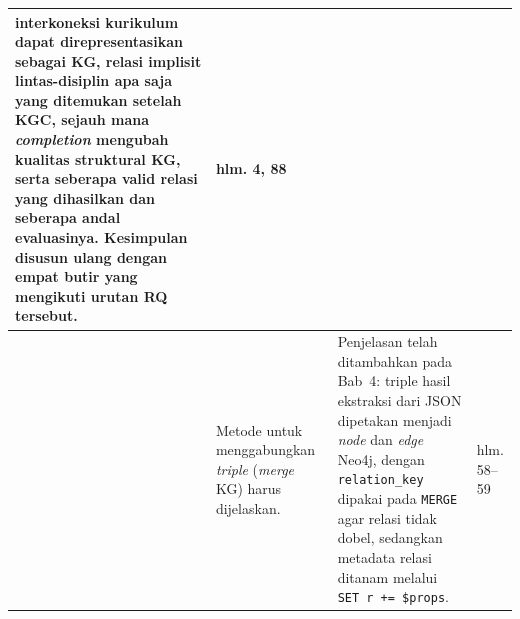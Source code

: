 \documentclass[12pt, a4paper]{article}
\begin{document}
\begin{longtable}{|
  >{\centering\arraybackslash}p{\revisionNoCol}|
  p{\revisionNoteCol}|
  p{\revisionResultCol}|
  >{\centering\arraybackslash}p{\revisionPageCol}|}
interkoneksi kurikulum dapat direpresentasikan sebagai KG, relasi implisit
lintas-disiplin apa saja yang ditemukan setelah KGC, sejauh mana
\textit{completion} mengubah kualitas struktural KG, serta seberapa valid relasi
yang dihasilkan dan seberapa andal evaluasinya. Kesimpulan disusun ulang dengan
empat butir yang mengikuti urutan RQ tersebut. &
hlm. 4, 88 \\
\hline
7 & Metode untuk menggabungkan \textit{triple} (\textit{merge} KG) harus
dijelaskan. & Penjelasan telah ditambahkan pada Bab~4: triple hasil ekstraksi
dari JSON dipetakan menjadi \textit{node} dan \textit{edge} Neo4j, dengan
\texttt{relation\_key} dipakai pada \texttt{MERGE} agar relasi tidak dobel,
sedangkan metadata relasi ditanam melalui \texttt{SET r += \$props}. &
hlm. 58--59 \\
\hline


\end{longtable}
\end{document}
